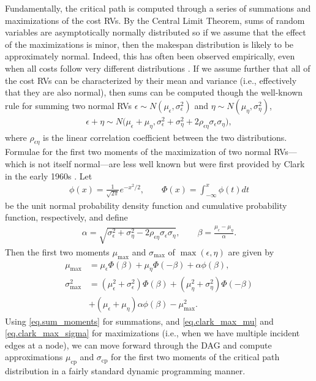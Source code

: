 \documentclass[12pt]{article}
\begin{document}
Fundamentally, the critical path is computed through a series of summations and maximizations of the cost RVs. By the Central Limit Theorem, sums of random variables are asymptotically normally distributed so if we assume that the effect of the maximizations is minor, then the makespan distribution is likely to be approximately normal. Indeed, this has often been observed empirically, even when all costs follow very different distributions \cite{can10}. If we assume further that all of the cost RVs can be characterized by their mean and variance (i.e., effectively that they are also normal), then sums can be computed though the well-known rule for summing two normal RVs $\epsilon \sim N(\mu_\epsilon, \sigma_\epsilon^2)$ and $\eta \sim N(\mu_\eta, \sigma_\eta^2)$,
\begin{align}
\label{eq.sum_moments}
\epsilon + \eta \sim N \big(\mu_\epsilon + \mu_\eta, \sigma_\epsilon^2 + \sigma_\eta^2 + 2 \rho_{\epsilon\eta}\sigma_\epsilon \sigma_\eta \big), 
\end{align}
where $\rho_{\epsilon\eta}$ is the linear correlation coefficient between the two distributions. Formulae for the first two moments of the maximization of two normal RVs---which is not itself normal---are less well known but were first provided by Clark in the early 1960s \cite{cla61}. Let 
\begin{align*}
\phi(x) = \frac{1}{\sqrt{2\pi}} e^{-x^2/2}, \qquad \Phi(x) = \int_{-\infty}^{x} \phi(t) dt
\end{align*}
be the unit normal probability density function and cumulative probability function, respectively, and define 
\begin{align}
\alpha = \sqrt{\sigma_\epsilon^2 + \sigma_\eta^2 - 2 \rho_{\epsilon\eta}\sigma_\epsilon \sigma_\eta}, \qquad \beta = \frac{\mu_\epsilon - \mu_\eta}{\alpha}. \label{eq.alpha_beta}
\end{align}
Then the first two moments $\mu_{\max}$ and $\sigma_{\max}$ of $\max(\epsilon, \eta)$ are given by
\begin{align}
\mu_{\max} &= \mu_\epsilon \Phi(\beta) + \mu_\eta \Phi(-\beta) + \alpha \phi(\beta), \label{eq.clark_max_mu}\\
\sigma_{\max}^2 &= (\mu_\epsilon^2 + \sigma_\epsilon^2) \Phi(\beta) + (\mu_\eta^2 + \sigma_\eta^2) \Phi(-\beta) \label{eq.clark_max_sigma}\\
&+ (\mu_\epsilon + \mu_\eta)\alpha\phi(\beta) -\mu_{\max}^2 \nonumber.
\end{align}
Using \eqref{eq.sum_moments} for summations, and \eqref{eq.clark_max_mu} and \eqref{eq.clark_max_sigma} for maximizations (i.e., when we have multiple incident edges at a node), we can move forward through the DAG and compute approximations $\mu_{\text{cp}}$ and $\sigma_{\text{cp}}$ for the first two moments of the critical path distribution in a fairly standard dynamic programming manner.    
\end{document}
